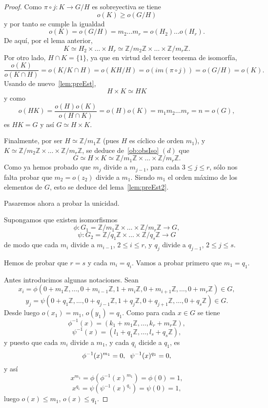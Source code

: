 \documentclass[12pt]{article}
\begin{document}
\begin{proof}
Como $\pi \circ j \colon K \longrightarrow G/H$ es sobreyectiva se tiene $$o(K) \geq o(G/H)$$ y por tanto se cumple la igualdad $$o(K) = o(G/H) =m_2 \ldots m_r = o(H_2) \ldots o(H_r).$$ De aquí, por el lema anterior, $$K \simeq H_2 \times \ldots \times H_r \simeq \mathbb{Z}/m_2 \mathbb{Z} \times \ldots \times \mathbb{Z}/m_r\mathbb{Z}.$$ Por otro lado, $H \cap K = \lbrace 1 \rbrace$, ya que en virtud del tercer teorema de isomorfía, $$\dfrac{o(K)}{o(K \cap H)} = o(K/K\cap H) = o(KH/H) = o(im (\pi \circ j)) = o(G/H) = o(K).$$ Usando de nuevo~\ref{lem:preEst}, $$H \times K \simeq HK$$ y como $$o(HK) = \dfrac{o(H)o(K)}{o(H\cap K)} = o(H)o(K) = m_1 m_2 \ldots m_r = n = o(G),$$ es $HK = G$ y así      $G \simeq H 	\times K$.

Finalmente, por ser $H \simeq \mathbb{Z}/m_1\mathbb{Z}$ (pues $H$ es cíclico de orden $m_1$), y $K \simeq \mathbb{Z}/m_2\mathbb{Z} \times \ldots \times \mathbb{Z}/m_r \mathbb{Z}$, se deduce de~\ref{ob:obsIso} $(d)$ que $$G \simeq H \times K \simeq \mathbb{Z}/m_1\mathbb{Z} \times \ldots \times \mathbb{Z}/m_r\mathbb{Z}.$$ Como ya hemos probado que $m_j$ divide a $m_{j-1}$, para cada $3 \leq j \leq r$, sólo nos falta probar que $m_2 = o(z_2)$ divide a $m_1$. Siendo $m_1$ el orden máximo de los elementos de $G$, esto se deduce del lema~\ref{lem:preEst2}.

Pasaremos ahora a probar la unicidad. 

Supongamos que existen isomorfismos $$\phi \colon G_1 = \mathbb{Z}/m_1\mathbb{Z}\times \ldots \times \mathbb{Z}/m_r\mathbb{Z} \longrightarrow G,$$ $$\psi \colon G_2 = \mathbb{Z}/q_1\mathbb{Z} \times \ldots \times \mathbb{Z}/q_s\mathbb{Z} \longrightarrow G$$ de modo que cada $m_i$ divide a $m_{i-1}$, $2 \leq i \leq r$, y $q_j$ divide a $q_{j-1}$, $2 \leq j \leq s.$

Hemos de probar que $r = s$ y cada $m_i = q_i$. Vamos a probar primero que $m_1 = q_1$.

Antes introducimos algunas notaciones. Sean $$x_i = \phi(0 + m_1 \mathbb{Z}, \ldots, 0 + m_{i-1}\mathbb{Z}, 1 + m_i\mathbb{Z}, 0 + m_{i+1} \mathbb{Z}, \ldots, 0 + m_r \mathbb{Z}) \in G,$$ $$y_j = \psi(0 + q_1\mathbb{Z}, \ldots, 0 + q_{j-1}\mathbb{Z}, 1 + q_j\mathbb{Z}, 0 + q_{j+1}\mathbb{Z}, \ldots, 0 + q_s\mathbb{Z}) \in G.$$ Desde luego $o(x_1) = m_1$, $o(y_1) = q_1$. Como para cada $x \in G$ se tiene $$\phi^{-1}(x) = (k_1 + m_1\mathbb{Z}, \ldots, k_r + m_r \mathbb{Z}),$$ $$\psi^{-1}(x) = (l_1 + q_1 \mathbb{Z}, \ldots, l_s + q_s\mathbb{Z}),$$ y puesto que cada $m_i$ divide a $m_1$, y cada $q_i$ dicide a $q_1$, es $$\phi^{-1}(x)^{m_1} = 0, \hspace{0.2cm} \psi^{-1}(x)^{q_1} = 0,$$ y así $$x^{m_1} = \phi(\phi^{-1}(x)^{m_1}) = \phi(0) = 1,$$ $$x^{q_1}  = \psi(\psi^{-1}(x)^{q_1}) = \psi(0) = 1,$$ luego $o(x) \leq m_1$, $o(x)\leq q_1$.


\end{proof}
\end{document}

